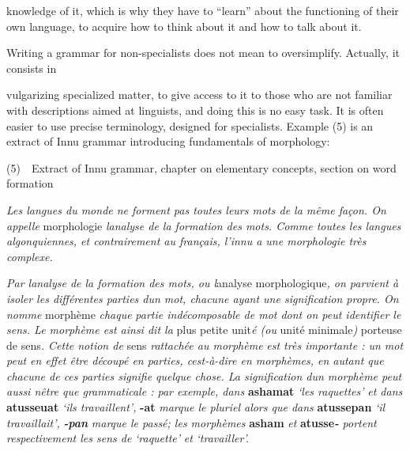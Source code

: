 \documentclass[letterpaper]{article}
\begin{document}
knowledge of it, which is why they have to {\textquotedblleft}learn{\textquotedblright} about the functioning of their own language, to acquire how to think about it and how to talk about it.

Writing a grammar for non-specialists does not mean to oversimplify. Actually, it consists in

vulgarizing specialized matter, to give access to it to those who are not familiar with descriptions aimed at linguists, and doing this is no easy task. It is often easier to use precise terminology, designed for specialists. Example (5) is an extract of Innu grammar introducing fundamentals of morphology:

(5)\ \ Extract of Innu grammar, chapter on elementary concepts, section on word formation

\textit{Les langues du monde ne forment pas toutes leurs mots de la m\^eme fa\c{c}on. On appelle }morphologie \textit{ }\textit{l{\textquotesingle}analyse de la formation des mots. Comme toutes les langues algonquiennes, et contrairement au fran\c{c}ais, l{\textquoteright}innu a une morphologie tr\`es complexe.}

\textit{Par l{\textquotesingle}analyse de la formation des mots, ou l{\textquotesingle}}analyse\textit{ }morphologique\textit{, on parvient \`a isoler les diff\'erentes parties d{\textquotesingle}un mot, chacune ayant une signification propre. On nomme }morph\`eme\textit{ chaque }\textit{partie ind\'ecomposable de mot dont on peut identifier le sens. Le morph\`eme est ainsi dit la }plus petite unit\textit{\'e (ou }unit\'e minimale\textit{) }porteuse de sens\textit{. Cette notion de }sens\textit{ rattach\'ee au morph\`eme}\textit{ }\textit{est tr\`es importante : un mot peut en effet \^etre d\'ecoup\'e en parties, c{\textquotesingle}est-\`a-dire en morph\`emes, en autant que chacune de ces parties signifie quelque chose. La signification d{\textquotesingle}un morph\`eme peut aussi n{\textquotesingle}\^etre que grammaticale : par exemple, dans }\textbf{ashamat}\textit{ }\textit{{\textquoteleft}}\textit{les raquettes}\textit{{\textquoteright}}\textit{ et dans }\textbf{atusseuat}\textit{ }\textit{{\textquoteleft}}\textit{ils travaillent}\textit{{\textquoteright}}\textit{, }\textbf{{}-}\textbf{at}\textit{ marque le pluriel alors que dans }\textbf{atussepan}\textit{ }\textit{{\textquoteleft}}\textit{il travaillait}\textit{{\textquoteright}}\textit{, }\textbf{\textit{{}-pan}}\textit{ marque le pass\'e; les morph\`emes }\textbf{asham}\textit{ et }\textbf{atusse}\textbf{\textit{{}-}}\textit{ portent respectivement les sens de }\textit{{\textquoteleft}}\textit{raquette}\textit{{\textquoteright}}\textit{ et }\textit{{\textquoteleft}}\textit{travailler}\textit{{\textquoteright}}\textit{.}
\end{document}
